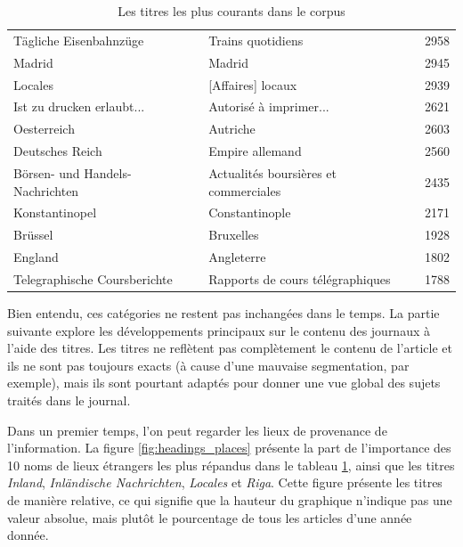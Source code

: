 \documentclass[a4paper,twoside,12pt]{article}
\begin{document}
\begin{table}[h]
\begin{tabular}{llr}
         Tägliche Eisenbahnzüge &                     Trains quotidiens &      2958 \\
                         Madrid &                                Madrid &      2945 \\
                        Locales &                     [Affaires] locaux &      2939 \\
      Ist zu drucken erlaubt... &                Autorisé à imprimer... &      2621 \\
                    Oesterreich &                              Autriche &      2603 \\
                Deutsches Reich &                       Empire allemand &      2560 \\
Börsen- und Handels-Nachrichten & Actualités boursières et commerciales &      2435 \\
                 Konstantinopel &                        Constantinople &      2171 \\
                        Brüssel &                             Bruxelles &      1928 \\
                        England &                            Angleterre &      1802 \\
   Telegraphische Coursberichte &      Rapports de cours télégraphiques &      1788 \\
\bottomrule
\end{tabular}
    \caption{Les titres les plus courants dans le corpus}
    \label{tab:common_headings}
\end{table}

Bien entendu, ces catégories ne restent pas inchangées dans le temps. La partie suivante explore les développements principaux sur le contenu des journaux à l'aide des titres. Les titres ne reflètent pas complètement le contenu de l'article et ils ne sont pas toujours exacts (à cause d'une mauvaise segmentation, par exemple), mais ils sont pourtant adaptés pour donner une vue global des sujets traités dans le journal.

Dans un premier temps, l'on peut regarder les lieux de provenance de l'information. La figure \ref{fig:headings_places} présente la part de l'importance des 10 noms de lieux étrangers les plus répandus dans le tableau \ref{tab:common_headings}, ainsi que les titres \textit{Inland}, \textit{Inländische Nachrichten}, \textit{Locales} et \textit{Riga}. Cette figure présente les titres de manière relative, ce qui signifie que la hauteur du graphique n'indique pas une valeur absolue, mais plutôt le pourcentage de tous les articles d'une année donnée.
\end{document}

